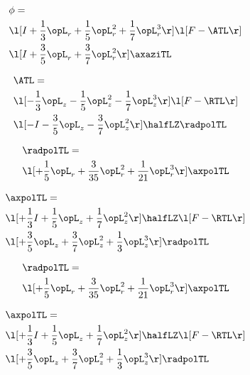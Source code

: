 \begin{alignat}{2} 
\label{eq:scalarFlux_0} 
& \phi = \\ 
& \l[ I + \frac{1}{3} \opL_r + \frac{1}{5} \opL_r^{2} + \frac{1}{7} \opL_r^{3}  \r] \l[ F - \ATL \r] \nonumber \\ 
& \l[ I + \frac{3}{5} \opL_r + \frac{3}{7} \opL_r^{2}  \r] \axaziTL \nonumber \\ 
\end{alignat} 


\begin{alignat}{2} 
\label{eq:isoATL_0} 
& \ATL = \\ 
& \l[ - \frac{1}{3} \opL_z - \frac{1}{5} \opL_z^{2} - \frac{1}{7} \opL_z^{3}  \r] \l[ F - \RTL \r] \nonumber \\ 
& \l[ - I - \frac{3}{5} \opL_z - \frac{3}{7} \opL_z^{2}  \r] \halfLZ \radpolTL \nonumber \\ 
\end{alignat} 


\begin{alignat}{2} 
\label{eq:linradpolTL_0} 
& \radpolTL = \\ 
& \l[ + \frac{1}{5} \opL_r + \frac{3}{35} \opL_r^{2} + \frac{1}{21} \opL_r^{3}  \r] \axpolTL \nonumber \\ 
\end{alignat} 


\begin{alignat}{2} 
\label{eq:linaxpolTL_0} 
& \axpolTL = \\ 
& \l[ + \frac{1}{3} I + \frac{1}{5} \opL_z + \frac{1}{7} \opL_z^{2}  \r] \halfLZ \l[ F - \RTL \r] \nonumber \\ 
& \l[ + \frac{3}{5} \opL_z + \frac{3}{7} \opL_z^{2} + \frac{1}{3} \opL_z^{3}  \r] \radpolTL \nonumber \\ 
\end{alignat} 


\begin{alignat}{2} 
\label{eq:linradpolTL_1} 
& \radpolTL = \\ 
& \l[ + \frac{1}{5} \opL_r + \frac{3}{35} \opL_r^{2} + \frac{1}{21} \opL_r^{3}  \r] \axpolTL \nonumber \\ 
\end{alignat} 


\begin{alignat}{2} 
\label{eq:linaxpolTL_1} 
& \axpolTL = \\ 
& \l[ + \frac{1}{3} I + \frac{1}{5} \opL_z + \frac{1}{7} \opL_z^{2}  \r] \halfLZ \l[ F - \RTL \r] \nonumber \\ 
& \l[ + \frac{3}{5} \opL_z + \frac{3}{7} \opL_z^{2} + \frac{1}{3} \opL_z^{3}  \r] \radpolTL \nonumber \\ 
\end{alignat} 


